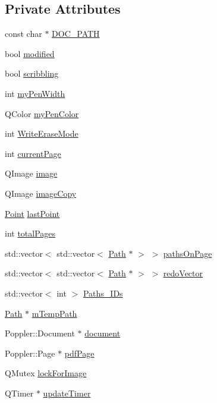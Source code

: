 \subsection*{Private Attributes}
\begin{DoxyCompactItemize}
\item 
const char $\ast$ \hyperlink{classScribbleArea_a5e555edb58a131ec02ea120bf4c8fd27}{DOC\_\-PATH}
\item 
bool \hyperlink{classScribbleArea_a3276ab91c9ab798edb920ec557a1775f}{modified}
\item 
bool \hyperlink{classScribbleArea_a457d8a9f83168cca50ed05675a086be3}{scribbling}
\item 
int \hyperlink{classScribbleArea_aa58c13c61afb70d698e44e9d849aa5ff}{myPenWidth}
\item 
QColor \hyperlink{classScribbleArea_a1f78169e565db8c4398974a48cc5ce7f}{myPenColor}
\item 
int \hyperlink{classScribbleArea_acca7f35976c146f050a05c6d31ee69f8}{WriteEraseMode}
\item 
int \hyperlink{classScribbleArea_aeb25d61ec956c4e0be05047c14491923}{currentPage}
\item 
QImage \hyperlink{classScribbleArea_ae55058216a87aeee72bcb1220bc3a89d}{image}
\item 
QImage \hyperlink{classScribbleArea_a00ee4e87a1a3e84656431248e38a93ec}{imageCopy}
\item 
\hyperlink{classPoint}{Point} \hyperlink{classScribbleArea_ac8ca5d7e5cdf01f9a5f5e04f113b36c5}{lastPoint}
\item 
int \hyperlink{classScribbleArea_aa4969a32252451bd4f51c4a56d07b719}{totalPages}
\item 
std::vector$<$ std::vector$<$ \hyperlink{classPath}{Path} $\ast$ $>$ $>$ \hyperlink{classScribbleArea_a942535e8baea0af4d05586670936b4bf}{pathsOnPage}
\item 
std::vector$<$ std::vector$<$ \hyperlink{classPath}{Path} $\ast$ $>$ $>$ \hyperlink{classScribbleArea_afe1dee6ab3f71d667010f85e38453ce7}{redoVector}
\item 
std::vector$<$ int $>$ \hyperlink{classScribbleArea_ac3830c66e5df84edb033843de2ea077b}{Paths\_\-IDs}
\item 
\hyperlink{classPath}{Path} $\ast$ \hyperlink{classScribbleArea_aad0cb58d4b1bd5f1e2c78854b181dbba}{mTempPath}
\item 
Poppler::Document $\ast$ \hyperlink{classScribbleArea_a5b8a8e5a70cde0078bb60fad3483e54f}{document}
\item 
Poppler::Page $\ast$ \hyperlink{classScribbleArea_a60a162ac373cf5584f37c64d1189fbd4}{pdfPage}
\item 
QMutex \hyperlink{classScribbleArea_ad4287ecc62db3677487e666cfa669a63}{lockForImage}
\item 
QTimer $\ast$ \hyperlink{classScribbleArea_acc356bd79ca5a2ffbd1cf0aebac58ec0}{updateTimer}
\end{DoxyCompactItemize}


